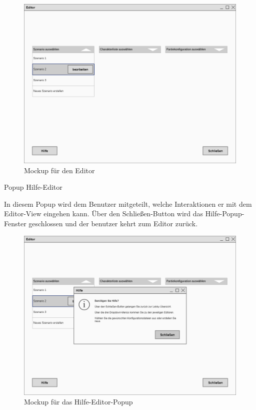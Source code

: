 \begin{figure}[H]
  \centering
  \includegraphics[width=\textwidth]{Meilenstein03/Editor_Mockup.png}
  \caption{Mockup für den Editor}
\end{figure}

Popup \glqq{}Hilfe-Editor\grqq{}

In diesem Popup wird dem Benutzer mitgeteilt, welche Interaktionen er mit dem Editor-View eingehen kann. Über den Schließen-Button wird das Hilfe-Popup-Fenster geschlossen und der benutzer kehrt zum Editor zurück.

\begin{figure}[H]
  \centering
  \includegraphics[width=\textwidth]{Meilenstein03/Hilfe-Editor_Mockup.png}
  \caption{Mockup für das Hilfe-Editor-Popup}
\end{figure}

